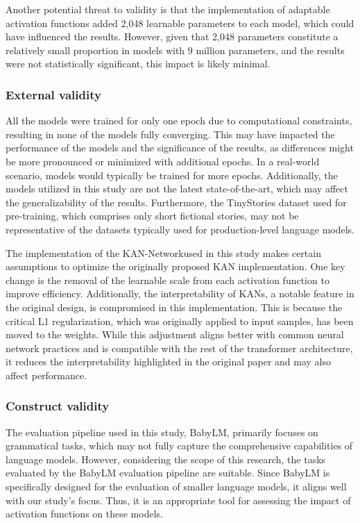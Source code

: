 Another potential threat to validity is that the implementation of adaptable activation functions added 2,048 learnable parameters to each model, which could have influenced the results. However, given that 2,048 parameters constitute a relatively small proportion in models with 9 million parameters, and the results were not statistically significant, this impact is likely minimal.

\subsubsection{External validity}
\label{sec:external}
All the models were trained for only one epoch due to computational constraints, resulting in none of the models fully converging. This may have impacted the performance of the models and the significance of the results, as differences might be more pronounced or minimized with additional epochs. In a real-world scenario, models would typically be trained for more epochs. Additionally, the models utilized in this study are not the latest state-of-the-art, which may affect the generalizability of the results. Furthermore, the TinyStories dataset used for pre-training, which comprises only short fictional stories, may not be representative of the datasets typically used for production-level language models.

The implementation of the KAN-Network\footnotemark[3] used in this study makes certain assumptions to optimize the originally proposed KAN implementation. One key change is the removal of the learnable scale from each activation function to improve efficiency. Additionally, the interpretability of KANs, a notable feature in the original design, is compromised in this implementation. This is because the critical L1 regularization, which was originally applied to input samples, has been moved to the weights. While this adjustment aligns better with common neural network practices and is compatible with the rest of the transformer architecture, it reduces the interpretability highlighted in the original paper and may also affect performance.

\subsubsection{Construct validity}
The evaluation pipeline used in this study, BabyLM, primarily focuses on grammatical tasks, which may not fully capture the comprehensive capabilities of language models. However, considering the scope of this research, the tasks evaluated by the BabyLM evaluation pipeline are suitable. Since BabyLM is specifically designed for the evaluation of smaller language models, it aligns well with our study's focus. Thus, it is an appropriate tool for assessing the impact of activation functions on these models.

